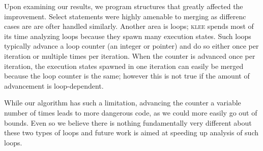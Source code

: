 \documentclass[12pt,a4paper]{article}
\newcommand{\klee}{\textsc{klee }}
\begin{document}
Upon examining our results, we program structures that greatly affected the improvement. Select statements were highly amenable to merging as differenc cases are are ofter handled similarly. Another area is loops; \klee spends most of its time analyzing loops because they spawn many execution states. Such loops typically advance a loop counter (an integer or pointer) and do so either once per iteration or multiple times per iteration. When the counter is advanced once per iteration, the execution states spawned in one iteration can easily be merged because the loop counter is the same; however this is not true if the amount of advancement is loop-dependent.

While our algorithm has such a limitation, advancing the counter a variable number of times leads to more dangerous code, as we could more easily go out of bounds. Even so we believe there is nothing fundamentally very different about these two types of loops and future work is aimed at speeding up analysis of such loops.
\end{document}
